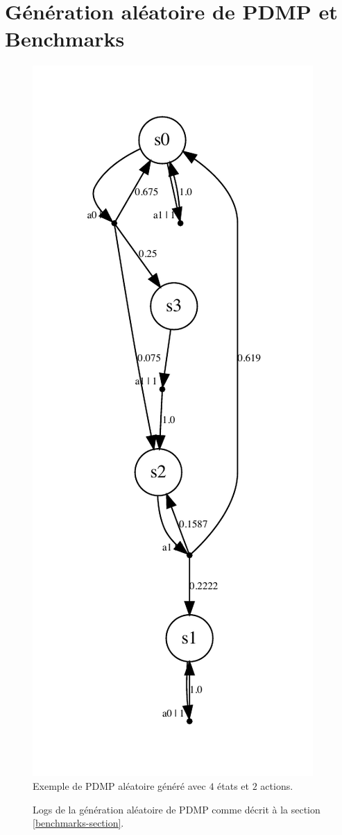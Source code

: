 \documentclass[12pt,a4paper]{report}
\theoremstyle{definition}%
\theoremstyle{remark}
\begin{document}
\section*{Génération aléatoire de PDMP et Benchmarks}
\begin{figure}[H]
	\centering
	\includegraphics[scale=0.6]{figures/random.pdf}
	\caption{Exemple de PDMP aléatoire généré avec $4$ états et $2$ actions.}
	\label{random-mdp}
\end{figure}
\begin{figure}
\centering
\tiny
{}
\normalsize
\caption{Logs de la génération aléatoire de PDMP comme décrit à la section \ref{benchmarks-section}.}
\label{benchmarks-random}
\end{figure}
\end{document}
